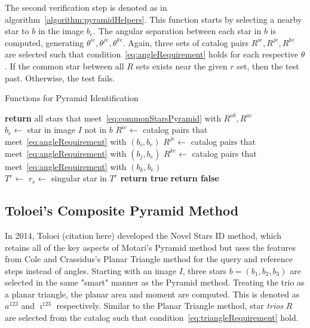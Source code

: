 
The second verification step is denoted as  in
algorithm~\autoref{algorithm:pyramidHelpers}. This function starts by selecting a nearby star to $b$ in the image
$b_e$. The angular separation between each star in $b$ is computed, generating $\theta^{ie}, \theta^{je},
\theta^{ke}$. Again, three sets of catalog pairs $R^{ie}, R^{je}, R^{ke}$ are selected such that
condition~\eqref{eq:angleRequirement} holds for each respective $\theta$. If the common star between all $R$ sets
exists near the given $r$ set, then the test past. Otherwise, the test fails.

\begin{algorithm}
    \caption{Functions for Pyramid Identification} \label{algorithm:pyramidHelpers}
    \begin{algorithmic}[1]
        \State \textbf{return} all stars that meet~\eqref{eq:commonStarsPyramid} with $R^{ab}, R^{ac}$
        \EndFunction
        \\
        \State $b_e \gets $ star in image $I$ not in $b$
        \State $R^{ie} \gets$ catalog pairs that meet~\eqref{eq:angleRequirement} with $(b_i, b_e)$
        \State $R^{je} \gets$ catalog pairs that meet~\eqref{eq:angleRequirement} with $(b_j, b_e)$
        \State $R^{ke} \gets$ catalog pairs that meet~\eqref{eq:angleRequirement} with $(b_k, b_e)$
        \\
        \State $T^e \gets $ 
        \State $r_e \gets $ singular star in $T^e$
        \State \textbf{return true}
        \EndIf
        \EndIf
        \State \textbf{return false}
        \EndFunction
    \end{algorithmic}
\end{algorithm}

\subsection{Toloei's Composite Pyramid Method}\label{subsec:toloei'sCompositePyramidMethod}
In 2014, Toloei (citation here) developed the Novel Stars ID method, which retains all of the key aspects of Motari's
Pyramid method but uses the features from Cole and Crassidus's Planar Triangle method for the query and reference steps
instead of angles. Starting with an image $I$, three stars $b = (b_1, b_2, b_3)$ are selected in the same "smart"
manner as the Pyramid method. Treating the trio as a planar triangle, the planar area and moment are computed.
This is denoted as $a^{123}$ and $\imath^{123}$ respectively. Similar to the Planar Triangle method, star
\textit{trios} $R$ are selected from the catalog such that condition~\eqref{eq:triangleRequirement} hold.

